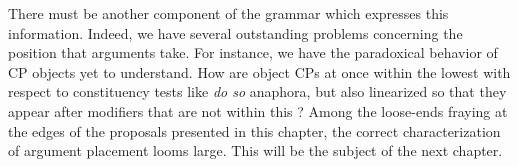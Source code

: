 There must be another component of the grammar which expresses this information. Indeed, we have several outstanding problems concerning the position that arguments take. For instance, we have the paradoxical behavior of CP objects yet to understand. How are object CPs at once within the lowest  with respect to constituency tests like \emph{do so} anaphora, but also linearized so that they appear after modifiers that are not within this ?  Among the loose-ends fraying at the edges of the proposals presented in this chapter, the correct characterization of argument placement looms large. This will be the subject of the next chapter.
